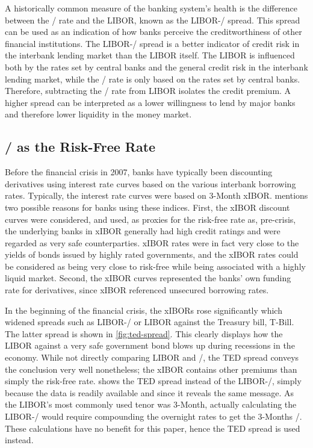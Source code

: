 \documentclass[main.tex]{subfiles}
\begin{document}
    A historically common measure of the banking system's health 
    is the difference between the \OIS/ rate and the LIBOR, known as the LIBOR-\OIS/ spread.
    This spread can be used as an indication of how banks perceive the creditworthiness
    of other financial institutions. 
    The LIBOR-\OIS/ spread is a better indicator of credit risk in the interbank lending market
    than the LIBOR itself. 
    The LIBOR is influenced both by the rates set by central banks and 
    the general credit risk in the interbank lending market,
    while the \OIS/ rate is only based on the rates set by central banks.
    Therefore, subtracting the \OIS/ rate from LIBOR isolates the credit premium.
    A higher spread can be interpreted as a lower willingness to lend by major banks
    and therefore lower liquidity in the money market.

    \subsection{\OIS/ as the Risk-Free Rate}
    
    Before the financial crisis in 2007, banks have typically been discounting
    derivatives using interest rate curves based on the various interbank borrowing rates.
    Typically, the interest rate curves were based on 3-Month xIBOR.
    \textcite[Section 8.6]{Green2015XVA} 
    mentions two possible reasons for banks using these indices.
    First, the xIBOR discount curves were considered, and used, as proxies for the risk-free rate
    as, pre-crisis, the underlying banks in xIBOR generally had high credit ratings
    and were regarded as very safe counterparties.
    xIBOR rates were in fact very close to the yields of bonds issued by highly rated governments,
    and the xIBOR rates could be considered as being very close to risk-free 
    while being associated with a highly liquid market.
    Second, the xIBOR curves represented the banks' own funding rate for derivatives, since
    xIBOR referenced unsecured borrowing rates.

    In the beginning of the financial crisis, the xIBORs rose significantly
    which widened spreads such as LIBOR-\OIS/ or LIBOR against the Treasury bill, T-Bill.
    The latter spread is shown in \cref{fig:ted-spread}. This clearly 
    displays how the LIBOR against a very safe government bond blows up
    during recessions in the economy. 
    While not directly comparing LIBOR and \OIS/, 
    the TED spread conveys the conclusion very well nonetheless;
    the xIBOR contains other premiums than simply the risk-free rate.
     shows the TED spread instead of the LIBOR-\OIS/,
    simply because the data is readily available and since it reveals the same message.
    As the LIBOR's most commonly used tenor was 3-Month, actually calculating the LIBOR-\OIS/
    would require compounding the overnight rates to get the 3-Months \OIS/.
    These calculations have no benefit for this paper, hence the TED spread is used instead.
\end{document}
